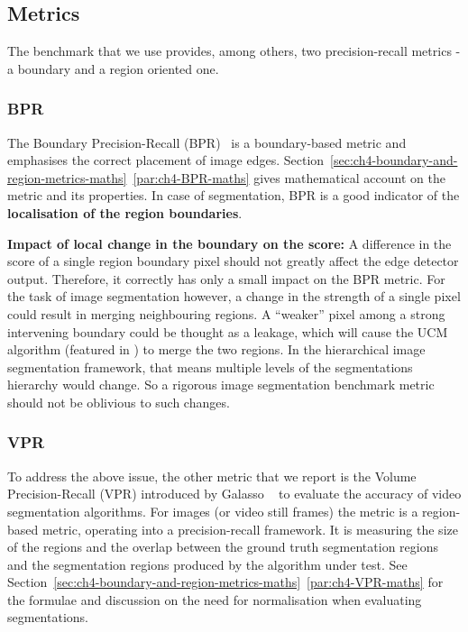 \subsection{Metrics}
The benchmark that we use provides, among others, two precision-recall metrics - a boundary and a region oriented one.

\subsubsection*{BPR}
The Boundary Precision-Recall (BPR)~\cite{Arbelaez11} is a boundary-based metric and emphasises the correct placement of image edges. Section~\ref*{sec:ch4-boundary-and-region-metrics-maths}~\ref{par:ch4-BPR-maths} %
gives mathematical account on the metric and its properties. In case of segmentation, BPR is a good indicator of the {\bf localisation of the region boundaries}.

\textbf{Impact of %
local change in the boundary on the score:} A difference in the score of a single region boundary pixel should not greatly affect the edge detector output. Therefore, it correctly has only a small impact on the BPR metric. For the task of image segmentation however, a change in the strength of a single pixel could result in merging neighbouring regions. A ``weaker'' pixel among a strong intervening boundary could be thought as a leakage, which will cause the UCM algorithm (featured in ) %
to merge the two regions. In the hierarchical image segmentation framework, that means multiple levels of the segmentations hierarchy would change. So a rigorous image segmentation benchmark metric should not be oblivious to such changes.

\subsubsection*{VPR}
To address the above issue, the other metric that we report is the Volume Precision-Recall (VPR) introduced by Galasso \etal~\cite{Galasso13} to evaluate the accuracy of video segmentation algorithms. For images (or video still frames) the metric is a region-based metric, operating %
into a precision-recall framework. It is measuring the size of the regions and the overlap between the ground truth segmentation regions and the segmentation regions produced by the algorithm under test. 
See Section~\ref*{sec:ch4-boundary-and-region-metrics-maths}~\ref{par:ch4-VPR-maths} for the formulae and discussion on the need for normalisation when evaluating segmentations.

